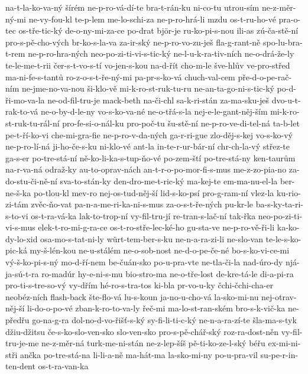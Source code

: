 {na-t-la-ko-va-ný
šírém
ne-p-ro-vá-dí-te
bra-t-rán-ku
ni-co-tu
utrou-sím
ne-z-měr-ný-mi
ne-vy-fou-kl
te-p-lem
me-lo-schi-za
ne-p-ro-hrá-li
mzdu
os-t-ru-ho-vé
pra-o-tec
os-tře-tic-ký
de-o-ny-mi-za-ce
po-drat
björ-je
ru-ko-pi-s-nou
ili-as
zú-ča-stě-ní
pro-s-pě-cho-vých
br-ko-s-la-va
za-ir-ský
ne-p-ro-vo-zu-ješ
fla-g-rant-ně
spo-lu-bra-t-rem
ne-p-ro-hra-ných
neo-po-zi-ti-vi-s-tic-ký
ne-l-u-k-ra-tiv-ních
ne-o-drá-že-ly
te-le-me-t-rii
čer-s-t-vo-s-tí
vo-jen-s-kou
na-d-řít
cho-m-le
šve-hlův
ve-pro-střed
ma-ni-fe-s-tantů
ro-z-o-s-t-ře-ný-mi
pa-pr-s-ko-vá
chuch-val-cem
pře-d-o-pe-rač-ním
ne-jme-no-va-nou
ši-klo-vě
mi-k-ro-st-ruk-tu-ru
ne-an-ta-go-ni-s-tic-ký
po-d-ři-mo-va-la
ne-od-fil-tru-je
mack-beth
na-či-chl
sa-k-ri-stán
za-ma-sku-ješ
dvo-u-t-rak-to-vá
ne-o-by-d-le-ny
vo-s-ko-va-né
ne-o-třá-s-la
nej-e-le-gant-něj-ším
mi-k-ro-st-ruk-tu-rál-ní
pro-fe-si-o-nál-ku
pro-poč-tu
šu-stě-ní
ne-p-ro-ve-di-tel-ná
ta-b-let
pe-t-ří-ko-vi
che-mi-gra-fie
ne-p-ro-v-da-ných
ga-r-ri-gue
zlo-děj-s-kej
vo-s-ko-vý
ne-p-ro-lí-ná
ji-ho-če-s-ku
ni-klo-vé
ant-la
in-te-r-ur-bár-ní
chr-ch-la-vý
střez-te
ga-s-er
po-tre-stá-ní
ně-ko-li-ka-s-tup-ňo-vé
po-zem-ští
po-tre-stá-ny
ken-taurům
na-r-va-ná
odraž-ky
au-to-oprav-nách
an-t-r-o-po-mor-fi-s-mus
me-z-zo-pia-no
za-do-stu-či-ně-ní
sva-to-stán-ky
den-dro-me-t-ric-ký
ma-kej-te
em-ma-nu-el-la
ber-ne-š-ka
po-tlou-kl
mev-ro
nej-os-tud-něj-ší
lid-s-ko-psí
pro-g-ram-ní
vlez-la
ku-rio-zi-tám
zvěc-ňo-vat
pa-n-a-me-ri-ka-ni-s-mus
za-o-s-t-ře-ných
pu-kr-le
ba-s-ky-ta-ri-s-to-vi
os-t-ra-vá-ka
lak-to-trop-ní
vy-fil-tru-jí
re-tran-s-lač-ní
tak-řka
neo-po-zi-ti-vi-s-mus
elek-t-ro-mi-g-ra-ce
os-t-ro-stře-lec-ké-ho
gu-sta-ve
ne-p-ro-vě-ři-li
ka-ko-dy-lo-xid
osa-mo-s-tat-ni-ly
würt-tem-ber-s-ku
ne-n-a-ra-zi-li
ne-slo-van
te-le-s-ko-pic-ká
my-š-lén-kou
ne-u-stálém
ne-o-sob-nost
ne-d-o-pe-če-né
bo-s-ko-vi-ce-mi
vý-š-ko-pi-s-ný
mo-d-ří-nem
be-čuán-sko
po-u-pra-vte
ne-tla-či-la
nad-úro-dy
njá-ja-sú-t-ra
ro-madúr
hy-e-ni-s-mu
bio-stro-ma
ne-o-tře-lost
de-kre-tá-le
di-a-pi-ra
pro-ti-s-tre-so-vý
vy-dřím
hé-ro-s-tra-tos
ki-bla
pr-vo-u-ky
čchi-čchi-cha-er
neobéz-ních
flash-back
šte-flo-vá
lu-s-koun
ja-no-u-cho-vá
la-sko-mi-nu
nej-otrav-něj-ší
li-do-o-po-vé
zban-k-ro-to-va-ly
řeč-mi
ma-lo-st-ran-ském
bro-s-k-vič-ka
ne-předřu
go-na-g-ra
dol-no-d-vo-řišť-s-ký
sy-fi-li-ti-c-ký
ne-n-a-ra-zí-te
šla-ma-s-tyk
džiu-džitsu
če-s-ko-slo-ven-sko
slo-ven-sko
pro-s-pě-chář-ský
roz-ra-dost-něn
vy-fil-tru-je-me
ne-z-měr-ná
turk-me-ni-stán
ne-z-lep-šíš
pě-ti-ko-ze-l-ský
béřu
ex-mi-ni-stři
ančka
po-tre-stá-na
li-li-a-ně
ma-hát-ma
la-sko-mi-ny
po-u-pra-vil
su-pe-r-in-ten-dent
os-t-ra-van-ka
}
